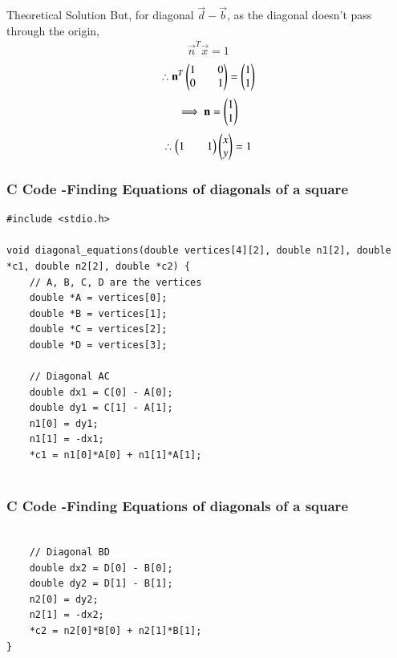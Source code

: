 \documentclass{beamer}
\begin{document}
\begin{frame}{Theoretical Solution}
But, for diagonal $\vec{d}-\vec{b}$, as the diagonal doesn't pass through the origin,
\begin{align*}
    \vec{n}^T\vec{x}=1
\end{align*}
\begin{align*}
    \therefore \mathbf{n}^T\begin{pmatrix}1&&0\\0&&1\end{pmatrix}=\begin{pmatrix}1\\1\end{pmatrix}
\end{align*}
\begin{align*}
    \implies \mathbf{n}=\begin{pmatrix}1\\1\end{pmatrix}
\end{align*}
\begin{align*}
    \therefore \begin{pmatrix}1&&1\end{pmatrix}\begin{pmatrix}x\\y\end{pmatrix}=1
\end{align*}
\end{frame}

\begin{frame}[fragile]
    \frametitle{C Code -Finding Equations of diagonals of a square}

    \begin{lstlisting}
#include <stdio.h>

void diagonal_equations(double vertices[4][2], double n1[2], double *c1, double n2[2], double *c2) {
    // A, B, C, D are the vertices
    double *A = vertices[0];
    double *B = vertices[1];
    double *C = vertices[2];
    double *D = vertices[3];

    // Diagonal AC
    double dx1 = C[0] - A[0];
    double dy1 = C[1] - A[1];
    n1[0] = dy1;
    n1[1] = -dx1;
    *c1 = n1[0]*A[0] + n1[1]*A[1];


    \end{lstlisting}
\end{frame}

\begin{frame}[fragile]
    \frametitle{C Code -Finding Equations of diagonals of a square}

    \begin{lstlisting}

    // Diagonal BD
    double dx2 = D[0] - B[0];
    double dy2 = D[1] - B[1];
    n2[0] = dy2;
    n2[1] = -dx2;
    *c2 = n2[0]*B[0] + n2[1]*B[1];
}
    \end{lstlisting}
\end{frame}
\end{document}

